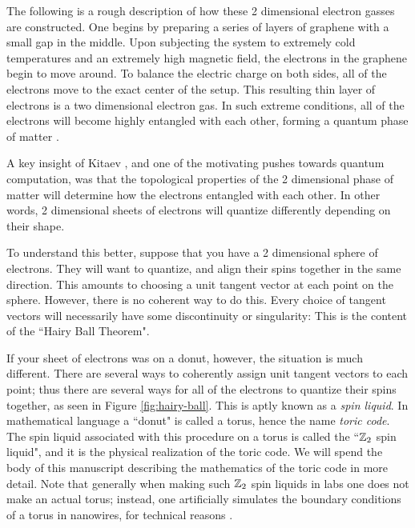 \documentclass{article}
\theoremstyle{definition}
\numberwithin{figure}{section}
\begin{document}
The following is a rough description of how these 2 dimensional electron gasses are constructed. One begins by preparing a series of layers of graphene with a small gap in the middle. Upon subjecting the system to extremely cold temperatures and an extremely high magnetic field, the electrons in the graphene begin to move around. To balance the electric charge on both sides, all of the electrons move to the exact center of the setup. This resulting thin layer of electrons is a two dimensional electron gas. In such extreme conditions, all of the electrons will become highly entangled with each other, forming a quantum phase of matter \cite{yang2021experimental}.

A key insight of Kitaev \cite{kitaev2003fault}, and one of the motivating pushes towards quantum computation, was that the topological properties of the 2 dimensional phase of matter will determine how the electrons entangled with each other. In other words, 2 dimensional sheets of electrons will quantize differently depending on their shape.

To understand this better, suppose that you have a 2 dimensional sphere of electrons. They will want to quantize, and align their spins together in the same direction. This amounts to choosing a unit tangent vector at each point on the sphere. However, there is no coherent way to do this. Every choice of tangent vectors will necessarily have some discontinuity or singularity: This is the content of the ``Hairy Ball Theorem".

If your sheet of electrons was on a donut, however, the situation is much different. There are several ways to coherently assign unit tangent vectors to each point; thus there are several ways for all of the electrons to quantize their spins together, as seen in Figure \ref{fig:hairy-ball}. This is aptly known as a \textit{spin liquid}. In mathematical language a ``donut" is called a torus, hence the name \textit{toric code}. The spin liquid associated with this procedure on a torus is called the ``$\mathbb{Z}_2$ spin liquid", and it is the physical realization of the toric code. We will spend the body of this manuscript describing the mathematics of the toric code in more detail. Note that generally when making such $\mathbb{Z}_2$ spin liquids in labs one does not make an actual torus; instead, one artificially simulates the boundary conditions of a torus in nanowires, for technical reasons \cite{albrecht2016exponential, mourik2012signatures}.
\end{document}
